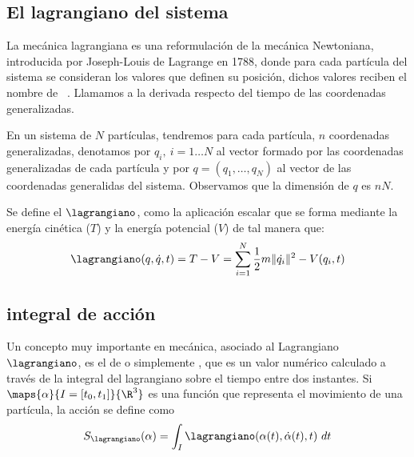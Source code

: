 \subsection{El lagrangiano del sistema}\label{sec:el-lagrangiano-del-sistema}

La mecánica lagrangiana es una reformulación de la mecánica Newtoniana, introducida por Joseph-Louis de Lagrange en 1788, donde para cada partícula del sistema se consideran los valores que definen su posición, dichos valores reciben el nombre de ~\autocite{GTP}.
Llamamos  a la derivada respecto del tiempo de las coordenadas generalizadas.

En un sistema de $N$ partículas, tendremos para cada partícula, $n$ coordenadas generalizadas, denotamos por $q_i,\ i=1\dots N$ al vector formado por las coordenadas generalizadas de cada partícula y por $q=(q_1,\dots,q_N)$ al vector de las coordenadas generalidas del sistema.
Observamos que la dimensión de $q$ es $nN$.

Se define el  $\lagrangiano$, como la aplicación escalar que se forma mediante la energía cinética ($T$) y la energía potencial ($V$) de tal manera que:
\begin{equation}
	\label{eq:lagrangiano_clasico}
	\lagrangiano(q,\dot{q},t)=T-V=\sum\limits_{i=1}^{N} \frac{1}{2}m\|\dot{q_i}\|^2-V(q_i,t)
\end{equation}

\subsection{integral de acción}\label{sec:integral-de-accion}

Un concepto muy importante en mecánica, asociado al Lagrangiano $\lagrangiano$, es el de  o simplemente , que es un valor numérico calculado a través de la integral del lagrangiano sobre el tiempo entre dos instantes.
Si $\maps{\alpha}{I=[t_0, t_1]}{\R^3}$ es una función que representa el movimiento de una partícula, la acción se define como
\begin{equation}
	\label{eq:accion}
	S_\lagrangiano(\alpha) = \int_{I}\lagrangiano(\alpha(t), \dot{\alpha}(t), t)\ dt
\end{equation}

